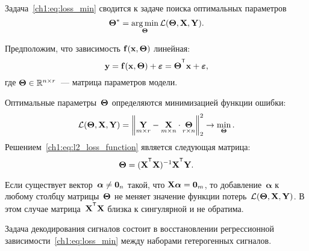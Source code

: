 \documentclass[11pt, a5paper]{dissert}
\begin{document}
Задача~\eqref{ch1:eq:loss_min} сводится к задаче поиска оптимальных параметров
\begin{equation}
	\boldsymbol{\Theta}^* = \mathop{\arg \min}\limits_{\boldsymbol{\Theta}} \mathcal{L}(\boldsymbol{\Theta}, \mathbf{X}, \mathbf{Y}).
	\label{ch1:eq:loss_min_param}
\end{equation}

Предположим, что зависимость $\mathbf{f}(\mathbf{x}, \boldsymbol{\Theta})$ линейная:
\begin{equation}
	\by = \mathbf{f}(\bx, \bTheta) + \bepsilon = \bTheta^{\T} \bx+ \bepsilon,
	\label{ch1:eq:lin_reg_model}
\end{equation}
где $\boldsymbol{\Theta} \in \mathbb{R}^{n \times r}$~--- матрица параметров модели.

Оптимальные параметры~$\boldsymbol{\Theta}$ определяются минимизацией функции ошибки:
\begin{equation}
	\mathcal{L}(\boldsymbol{\Theta}, \mathbf{X}, \mathbf{Y}) = {\left\| \underset{m \times r}{\mathbf{Y}}  - \underset{m \times n}{\mathbf{X}} \cdot \underset{r \times n}{\boldsymbol{\Theta}} \right\| }_2^2 \rightarrow\min_{\boldsymbol{\Theta}}.
	\label{ch1:eq:l2_loss_function}
\end{equation}
Решением~\eqref{ch1:eq:l2_loss_function} является следующая матрица:
\begin{equation*}
	\bTheta = (\bX^{\T} \bX)^{-1} \bX^{\T} \bY.
\end{equation*}

Если существует вектор~$\boldsymbol{\alpha} \neq \boldsymbol{0}_n$ такой, что $\mathbf{X} \boldsymbol{\alpha}= \boldsymbol{0}_m$, то добавление~$\boldsymbol{\alpha}$ к любому столбцу матрицы~$\boldsymbol{\Theta}$ не меняет значение функции потерь~$\mathcal{L}(\boldsymbol{\Theta}, \mathbf{X}, \mathbf{Y})$.
В этом случае матрица~$\bX^{\T} \bX$ близка к сингулярной и не обратима.

Задача декодирования сигналов состоит в восстановлении регрессионной зависимости~\eqref{ch1:eq:loss_min} между наборами гетерогенных сигналов.
\end{document}

